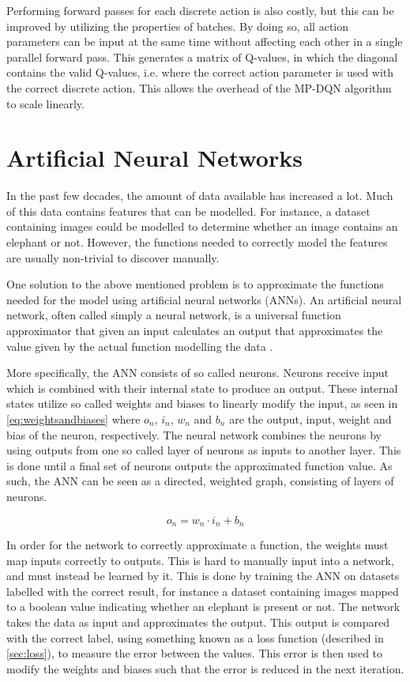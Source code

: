 \documentclass{kththesis}
\begin{document}
Performing forward passes for each discrete action is also costly, but this can be improved by utilizing the properties of batches. By doing so, all action parameters can be input at the same time without affecting each other in a single parallel forward pass. This generates a matrix of Q-values, in which the diagonal contains the valid Q-values, i.e. where the correct action parameter is used with the correct discrete action. This allows the overhead of the MP-DQN algorithm to scale linearly. \parencite{bester2019mpdqn}

\section{Artificial Neural Networks}
\label{sec:neuralnetworks}
In the past few decades, the amount of data available has increased a lot. Much of this data contains features that can be modelled. For instance, a dataset containing images could be modelled to determine whether an image contains an elephant or not. However, the functions needed to correctly model the features are usually non-trivial to discover manually.

One solution to the above mentioned problem is to approximate the functions needed for the model using artificial neural networks (ANNs). An artificial neural network, often called simply a neural network, is a universal function approximator that given an input calculates an output that approximates the value given by the actual function modelling the data \parencite{rojas2013neural}. 

More specifically, the ANN consists of so called neurons. Neurons receive input which is combined with their internal state to produce an output. These internal states utilize so called weights and biases to linearly modify the input, as seen in \autoref{eq:weightsandbiases} where $o_n$, $i_n$, $w_n$ and $b_n$ are the output, input, weight and bias of the neuron, respectively. The neural network combines the neurons by using outputs from one so called layer of neurons as inputs to another layer. This is done until a final set of neurons outputs the approximated function value. As such, the ANN can be seen as a directed, weighted graph, consisting of layers of neurons. \parencite{lecun2015deep} 

\begin{equation}
\label{eq:weightsandbiases}
o_n = w_n \cdot i_n + b_n 
\end{equation}

In order for the network to correctly approximate a function, the weights must map inputs correctly to outputs. This is hard to manually input into a network, and must instead be learned by it. This is done by training the ANN on datasets labelled with the correct result, for instance a dataset containing images mapped to a boolean value indicating whether an elephant is present or not. The network takes the data as input and approximates the output. This output is compared with the correct label, using something known as a loss function (described in \autoref{sec:loss}), to measure the error between the values. This error is then used to modify the weights and biases such that the error is reduced in the next iteration. \parencite{lecun2015deep} 
\end{document}
